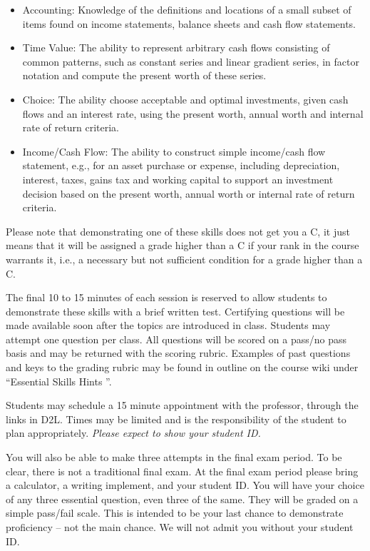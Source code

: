 \documentclass[letterpaper,10pt]{article}
\begin{document}
\begin{itemize}

\item Accounting: Knowledge of the definitions and locations of a
  small subset of items found on income statements, balance sheets and
  cash flow statements.

\item Time Value: The ability to represent arbitrary cash flows
  consisting of common patterns, such as constant series and linear
  gradient series, in factor notation and compute the present worth of
  these series.

\item Choice: The ability choose acceptable and optimal investments,
  given cash flows and an interest rate, using the present worth,
  annual worth and internal rate of return criteria.

\item Income/Cash Flow: The ability to construct simple income/cash
  flow statement, e.g., for an asset purchase or expense, including
  depreciation, interest, taxes, gains tax and working capital to
  support an investment decision based on the present worth, annual
  worth or internal rate of return criteria.
\end{itemize}

Please note that demonstrating one of these skills does not get you a
C, it just means that it will be assigned a grade higher than a C if
your rank in the course warrants it, i.e., a necessary but not sufficient condition for a grade higher than a C.

The final 10 to 15 minutes of each session is reserved to allow
students to demonstrate these skills with a brief written test.
Certifying questions will be made available soon after the topics are introduced in class. Students may attempt one question per class.  All questions
will be scored on a pass/no pass basis and may be returned with the
scoring rubric.  
Examples of past questions and keys to the grading rubric may be found
in outline on the course wiki under ``Essential Skills Hints ''.


Students may schedule a 15 minute appointment with the professor, through the links
in D2L.   Times may be limited
and is the responsibility of the student to plan appropriately.
\emph{Please expect to show your student ID.}

You will also be able to make three attempts in the
final exam period.   To be clear, there is not a traditional final exam. At the final exam period please bring a calculator, a writing implement, and
your student ID.  You will have your choice of any three essential
question, even three of the same.  They will be graded on a simple
pass/fail scale.  This is intended to be your last chance to
demonstrate proficiency -- not the main chance.  We will not admit you
without your student ID.
\end{document}
